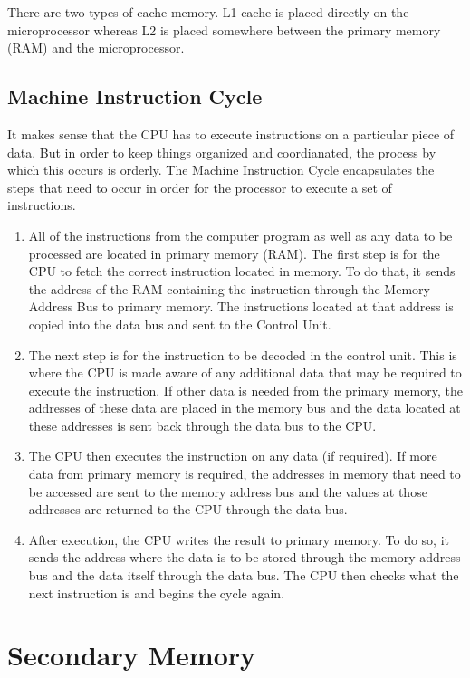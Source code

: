 There are two types of cache memory. L1 cache is placed directly on the microprocessor whereas L2 is placed somewhere between the primary memory (RAM) and the microprocessor. 

\subsection*{Machine Instruction Cycle}
It makes sense that the CPU has to execute instructions on a particular piece of data. But in order to keep things organized and coordianated, the process by which this occurs is orderly. The Machine Instruction Cycle encapsulates the steps that need to occur in order for the processor to execute a set of instructions.

\begin{enumerate}
	\item All of the instructions from the computer program as well as any data to be processed are located in primary memory (RAM). The first step is for the CPU to fetch the correct instruction located in memory. To do that, it sends the address of the RAM containing the instruction through the Memory Address Bus to primary memory. The instructions located at that address is copied into the data bus and sent to the Control Unit. 
	\item The next step is for the instruction to be decoded in the control unit. This is where the CPU is made aware of any additional data that may be required to execute the instruction. If other data is needed from the primary memory, the addresses of these data are placed in the memory bus and the data located at these addresses is sent back through the data bus to the CPU.
	\item The CPU then executes the instruction on any data (if required). If more data from primary memory is required, the addresses in memory that need to be accessed are sent to the memory address bus and the values at those addresses are returned to the CPU through the data bus.
	\item After execution, the CPU writes the result to primary memory. To do so, it sends the address where the data is to be stored through the memory address bus and the data itself through the data bus. The CPU then checks what the next instruction is and begins the cycle again.
\end{enumerate}
\section{Secondary Memory}
